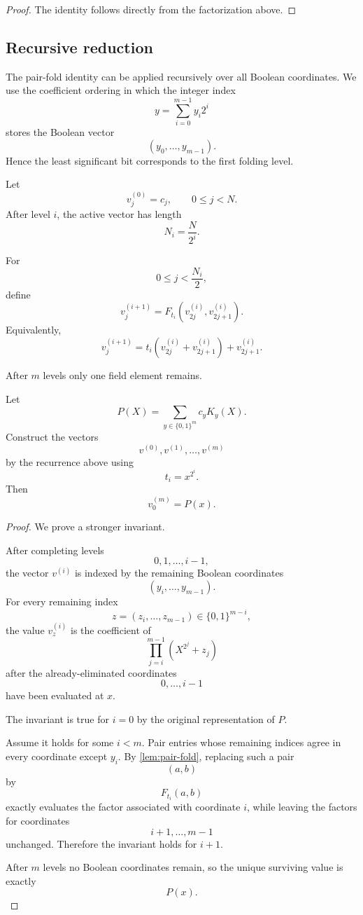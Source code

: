 \begin{proof}
The identity follows directly from the factorization above.
\end{proof}

\subsection{Recursive reduction}

The pair-fold identity can be applied recursively over all Boolean
coordinates.  We use the coefficient ordering in which the integer index
\[
y=\sum_{i=0}^{m-1}y_i2^i
\]
stores the Boolean vector
\[
(y_0,\ldots,y_{m-1}).
\]
Hence the least significant bit corresponds to the first folding level.

Let
\[
v^{(0)}_j=c_j,
\qquad
0\le j<N.
\]
After level \(i\), the active vector has length
\[
N_i=\frac{N}{2^i}.
\]

For
\[
0\le j<\frac{N_i}{2},
\]
define
\[
v^{(i+1)}_j
=
F_{t_i}
\left(
v^{(i)}_{2j},
v^{(i)}_{2j+1}
\right).
\]
Equivalently,
\[
v^{(i+1)}_j
=
t_i
\left(
v^{(i)}_{2j}
+
v^{(i)}_{2j+1}
\right)
+
v^{(i)}_{2j+1}.
\]

After \(m\) levels only one field element remains.

\begin{theorem}
\label{thm:kernel-eval-correct}
Let
\[
P(X)
=
\sum_{y\in\{0,1\}^m}
c_yK_y(X).
\]
Construct the vectors
\[
v^{(0)},v^{(1)},\ldots,v^{(m)}
\]
by the recurrence above using
\[
t_i=x^{2^i}.
\]
Then
\[
v^{(m)}_0=P(x).
\]
\end{theorem}

\begin{proof}
We prove a stronger invariant.

After completing levels
\[
0,1,\ldots,i-1,
\]
the vector \(v^{(i)}\) is indexed by the remaining Boolean coordinates
\[
(y_i,\ldots,y_{m-1}).
\]
For every remaining index
\[
z=(z_i,\ldots,z_{m-1})\in\{0,1\}^{m-i},
\]
the value \(v^{(i)}_z\) is the coefficient of
\[
\prod_{j=i}^{m-1}
\left(X^{2^j}+z_j\right)
\]
after the already-eliminated coordinates
\[
0,\ldots,i-1
\]
have been evaluated at \(x\).

The invariant is true for \(i=0\) by the original representation of
\(P\).

Assume it holds for some \(i<m\).  Pair entries whose remaining indices
agree in every coordinate except \(y_i\).  By
\cref{lem:pair-fold}, replacing such a pair
\[
(a,b)
\]
by
\[
F_{t_i}(a,b)
\]
exactly evaluates the factor associated with coordinate \(i\), while
leaving the factors for coordinates
\[
i+1,\ldots,m-1
\]
unchanged.  Therefore the invariant holds for \(i+1\).

After \(m\) levels no Boolean coordinates remain, so the unique surviving
value is exactly
\[
P(x).
\]
\end{proof}

